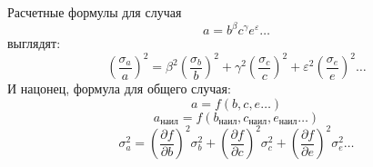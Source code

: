 Расчетные формулы для случая
\begin{equation}
a = b^\beta c^\gamma e^\varepsilon \ldots
\end{equation}
выглядят:
\begin{equation}
\left(\frac{\sigma_a}{a}\right)^2 = \beta^2 \left(\frac{\sigma_b}{b}\right)^2 + \gamma^2 \left(\frac{\sigma_c}{c}\right)^2 + \varepsilon^2 \left(\frac{\sigma_e}{e}\right)^2 \ldots
\end{equation}
И нацонец, формула для общего случая:
\begin{equation}
a = f(b,c,e \ldots)
\end{equation}
\begin{equation}
a_\text{наил} = f(b_\text{наил}, c_\text{наил}, e_\text{наил} \ldots)
\end{equation}
\begin{equation}
\sigma_a^2 = \left(\frac{\partial f}{\partial b}\right)^2 \sigma_b^2 + \left(\frac{\partial f}{\partial c}\right)^2 \sigma_c^2 +\left(\frac{\partial f}{\partial e}\right)^2 \sigma_e^2 \ldots
\end{equation}